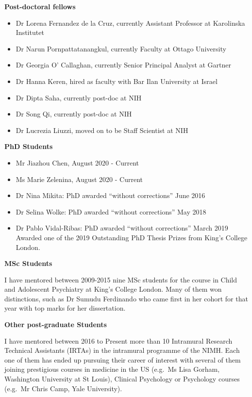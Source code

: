 \documentclass[
]{article}
\begin{document}
\textbf{Post-doctoral fellows}

\begin{itemize}
\item
  Dr Lorena Fernandez de la Cruz, currently Assistant Professor at
  Karolinska Institutet
\item
  Dr Narun Pornpattatanangkul, currently Faculty at Ottago University
\item
  Dr Georgia O' Callaghan, currently Senior Principal Analyst at Gartner
\item
  Dr Hanna Keren, hired as faculty with Bar Ilan University at Israel
\item
  Dr Dipta Saha, currently post-doc at NIH
\item
  Dr Song Qi, currently post-doc at NIH
\item
  Dr Lucrezia Liuzzi, moved on to be Staff Scientist at NIH
\end{itemize}

\textbf{PhD Students}

\begin{itemize}
\item
  Mr Jiazhou Chen, August 2020 - Current
\item
  Ms Marie Zelenina, August 2020 - Current
\item
  Dr Nina Mikita: PhD awarded ``without corrections'' June 2016
\item
  Dr Selina Wolke: PhD awarded ``without corrections'' May 2018
\item
  Dr Pablo Vidal-Ribas: PhD awarded ``without corrections'' March 2019
  Awarded one of the 2019 Outstanding PhD Thesis Prizes from King's
  College London.
\end{itemize}

\textbf{MSc Students}

I have mentored between 2009-2015 nine MSc students for the course in
Child and Adolescent Psychiatry at King's College London. Many of them
won distinctions, such as Dr Sumudu Ferdinando who came first in her
cohort for that year with top marks for her dissertation.

\textbf{Other post-graduate Students}

I have mentored between 2016 to Present more than 10 Intramural Research
Technical Assistants (IRTAs) in the intramural programme of the NIMH.
Each one of them has ended up pursuing their career of interest with
several of them joining prestigious courses in medicine in the US
(e.g.~Ms Lisa Gorham, Washington University at St Louis), Clinical
Psychology or Psychology courses (e.g.~Mr Chris Camp, Yale University).
\end{document}
